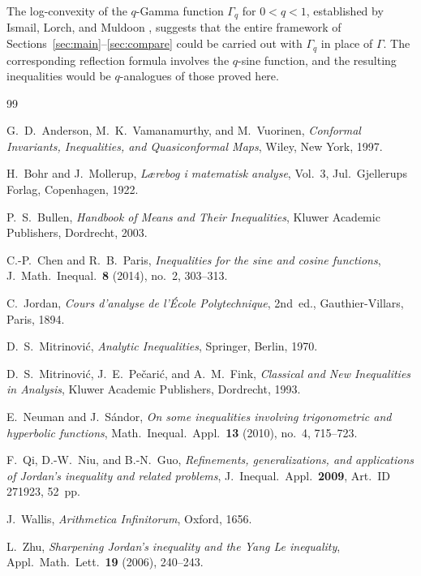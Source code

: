 \documentclass[12pt]{amsart}
\theoremstyle{definition}
\begin{document}
The log-convexity of the $q$-Gamma function $\Gamma_q$ for $0<q<1$,
established by Ismail, Lorch, and Muldoon \cite{Mitrinovic1970},
suggests that the entire framework of
Sections~\ref{sec:main}--\ref{sec:compare} could be carried out with
$\Gamma_q$ in place of $\Gamma$.  The corresponding reflection
formula involves the $q$-sine function, and the resulting
inequalities would be $q$-analogues of those proved here.


\begin{thebibliography}{99}

G.~D.~Anderson, M.~K.~Vamanamurthy, and M.~Vuorinen,
\textit{Conformal Invariants, Inequalities, and Quasiconformal Maps},
Wiley, New York, 1997.

H.~Bohr and J.~Mollerup,
\textit{L{\ae}rebog i matematisk analyse}, Vol.~3,
Jul.~Gjellerups Forlag, Copenhagen, 1922.

P.~S.~Bullen,
\textit{Handbook of Means and Their Inequalities},
Kluwer Academic Publishers, Dordrecht, 2003.

C.-P.~Chen and R.~B.~Paris,
\textit{Inequalities for the sine and cosine functions},
J.\ Math.\ Inequal.\ \textbf{8} (2014), no.~2, 303--313.



C.~Jordan,
\textit{Cours d'analyse de l'\'Ecole Polytechnique}, 2nd~ed.,
Gauthier-Villars, Paris, 1894.

D.~S.~Mitrinovi\'c,
\textit{Analytic Inequalities},
Springer, Berlin, 1970.

D.~S.~Mitrinovi\'c, J.~E.~Pe\v{c}ari\'c, and A.~M.~Fink,
\textit{Classical and New Inequalities in Analysis},
Kluwer Academic Publishers, Dordrecht, 1993.

E.~Neuman and J.~S\'andor,
\textit{On some inequalities involving trigonometric and hyperbolic
functions},
Math.\ Inequal.\ Appl.\ \textbf{13} (2010), no.~4, 715--723.

F.~Qi, D.-W.~Niu, and B.-N.~Guo,
\textit{Refinements, generalizations, and applications of
Jordan's inequality and related problems},
J.\ Inequal.\ Appl.\ \textbf{2009}, Art.\ ID 271923, 52~pp.

J.~Wallis,
\textit{Arithmetica Infinitorum},
Oxford, 1656.

L.~Zhu,
\textit{Sharpening Jordan's inequality and the Yang Le inequality},
Appl.\ Math.\ Lett.\ \textbf{19} (2006), 240--243.

\end{thebibliography}
\end{document}
